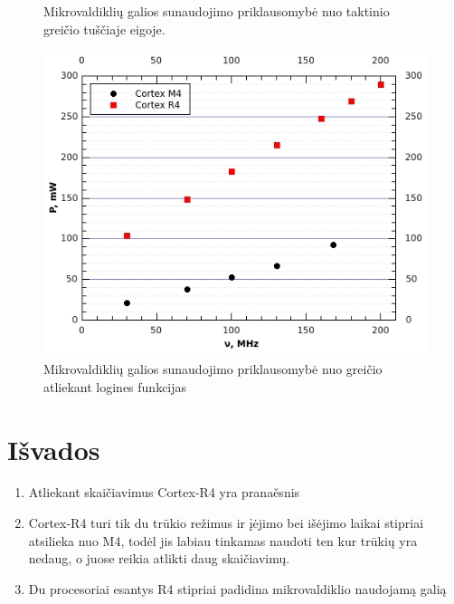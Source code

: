 \documentclass[a4paper, 12pt]{article} %
\begin{document}
\begin{onehalfspacing}
\begin{figure}[H]
\captionsetup{labelformat=numbfirst} %
\captionsetup{labelseparator=tarpas}
\caption{Mikrovaldikli\k{u} galios sunaudojimo priklausomyb\.e nuo taktinio grei\v{c}io tu\v{s}\v{c}iaje eigoje.}
\label{vienas}
\end{figure}
\begin{figure}[H] %
\centering %
\includegraphics[scale=0.8]{pav/binary.jpg} %
\captionsetup{labelformat=numbfirst} %
\captionsetup{labelseparator=tarpas}
\caption{Mikrovaldikli\k{u} galios sunaudojimo priklausomyb\.e nuo grei\v{c}io atliekant logines funkcijas}
\label{vienas}
\end{figure}


\section{I\v{s}vados}


\begin{enumerate}
\item Atliekant skai\v{c}iavimus Cortex-R4 yra prana\v{e}snis
\item Cortex-R4 turi tik du tr\=ukio re\v{z}imus ir \k{i}\.ejimo bei i\v{s}\.ejimo laikai stipriai atsilieka nuo M4, tod\.el jis labiau tinkamas naudoti ten kur tr\=uki\k{u} yra nedaug, o juose reikia atlikti daug skai\v{c}iavim\k{u}.
\item Du procesoriai esantys R4 stipriai padidina mikrovaldiklio naudojam\k{a} gali\k{a}
\end{enumerate}


\end{onehalfspacing}
\end{document}
